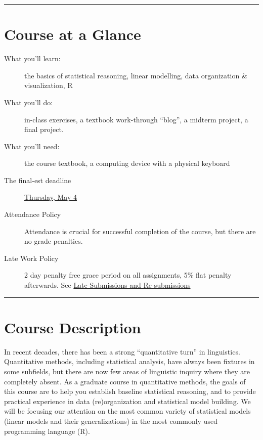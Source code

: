 \documentclass[
  letterpaper,
  DIV=11,
  numbers=noendperiod]{scrartcl}
\begin{document}
\begin{center}\rule{0.5\linewidth}{0.5pt}\end{center}

\hypertarget{course-at-a-glance}{%
\section{Course at a Glance}\label{course-at-a-glance}}

\begin{description}
\item[What you'll learn:]
the basics of statistical reasoning, linear modelling, data organization
\& visualization, R
\item[What you'll do:]
in-class exercises, a textbook work-through ``blog'', a midterm project,
a final project.
\item[What you'll need:]
the course textbook, a computing device with a physical keyboard
\item[The final-est deadline]
\protect\hyperlink{the-final-est-deadline}{Thursday, May 4}
\end{description}

\begin{description}
\item[Attendance Policy]
Attendance is crucial for successful completion of the course, but there
are no grade penalties.
\item[Late Work Policy]
2 day penalty free grace period on all assignments, 5\% flat penalty
afterwards. See
\protect\hyperlink{late-submissions-and-re-submissions}{Late Submissions
and Re-submissions}
\end{description}

\begin{center}\rule{0.5\linewidth}{0.5pt}\end{center}

\hypertarget{course-description}{%
\section{Course Description}\label{course-description}}

In recent decades, there has been a strong ``quantitative turn'' in
linguistics. Quantitative methods, including statistical analysis, have
always been fixtures in some subfields, but there are now few areas of
linguistic inquiry where they are completely absent. As a graduate
course in quantitative methods, the goals of this course are to help you
establish baseline statistical reasoning, and to provide practical
experience in data (re)organization and statistical model building. We
will be focusing our attention on the most common variety of statistical
models (linear models and their generalizations) in the most commonly
used programming language (R).
\end{document}
